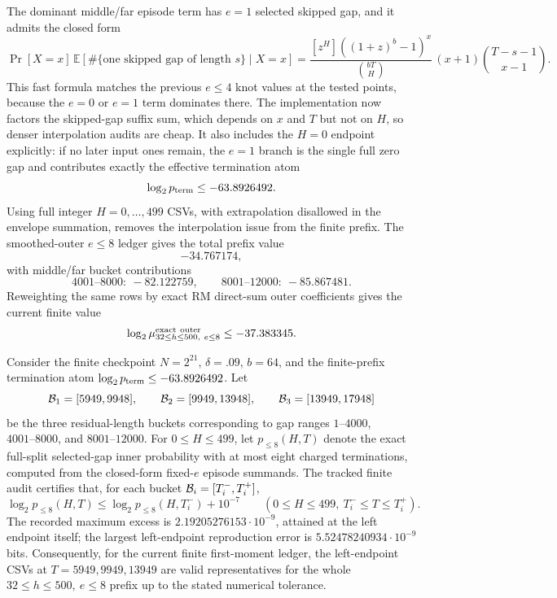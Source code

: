 The dominant middle/far episode term has \(e=1\) selected skipped gap, and it admits the closed form
\[
\Pr[X=x]\,
\mathbb{E}[\#\{\text{one skipped gap of length }s\}\mid X=x]
=
\frac{[z^H]((1+z)^b-1)^x}{\binom{bT}{H}}\,(x+1)\binom{T-s-1}{x-1}.
\]
This fast formula matches the previous \(e\le4\) knot values at the tested points, because the \(e=0\) or \(e=1\) term
dominates there.  The implementation now factors the skipped-gap suffix sum, which depends on \(x\) and \(T\) but not
on \(H\), so denser interpolation audits are cheap.  It also includes the \(H=0\) endpoint explicitly: if no later input
ones remain, the \(e=1\) branch is the single full zero gap and contributes exactly the effective termination atom
\[
\log_2 p_{\rm term}\le -63.8926492.
\]
Using full integer \(H=0,\ldots,499\) CSVs, with extrapolation disallowed in the envelope summation, removes the
interpolation issue from the finite prefix.  The smoothed-outer \(e\le8\) ledger gives the total prefix value
\[
-34.767174,
\]
with middle/far bucket contributions
\[
4001\text{--}8000:\ -82.122759,\qquad
8001\text{--}12000:\ -85.867481.
\]
Reweighting the same rows by exact RM direct-sum outer coefficients gives the current finite value
\[
\log_2\mu_{32\le h\le500,\ e\le8}^{\rm exact\ outer}\le -37.383345.
\]
\begin{lemma}
\label{lem:fullsplit-tiny-prefix-interiorT}
Consider the finite checkpoint \(N=2^{21}\), \(\delta=.09\), \(b=64\), and the finite-prefix termination atom
\(\log_2 p_{\rm term}\le -63.8926492\).  Let
\[
{\cal B}_1=[5949,9948],\qquad
{\cal B}_2=[9949,13948],\qquad
{\cal B}_3=[13949,17948]
\]
be the three residual-length buckets corresponding to gap ranges \(1\text{--}4000\),
\(4001\text{--}8000\), and \(8001\text{--}12000\).  For \(0\le H\le499\), let
\(p_{\le8}(H,T)\) denote the exact full-split selected-gap inner probability with at most eight charged
terminations, computed from the closed-form fixed-\(e\) episode summands.  The tracked finite audit certifies that,
for each bucket \({\cal B}_i=[T_i^-,T_i^+]\),
\[
\log_2 p_{\le8}(H,T)
\le
\log_2 p_{\le8}(H,T_i^-)+10^{-7}
\qquad
(0\le H\le499,\ T_i^-\le T\le T_i^+).
\]
The recorded maximum excess is \(2.19205276153\cdot 10^{-9}\), attained at the left endpoint itself; the largest
left-endpoint reproduction error is \(5.52478240934\cdot 10^{-9}\) bits.  Consequently, for the current finite
first-moment ledger, the left-endpoint CSVs at \(T=5949,9949,13949\) are valid representatives for the whole
\(32\le h\le500,\ e\le8\) prefix up to the stated numerical tolerance.
\end{lemma}

